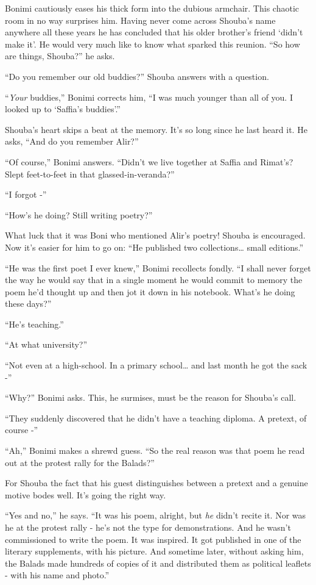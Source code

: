 \documentclass[twoside,11pt]{book}
\begin{document}
Bonimi cautiously eases his thick form into the dubious armchair. This chaotic room in no way surprises him. Having
never come across Shouba's name anywhere all these years he has concluded that his older brother's friend
`didn't make it'.
He would very much like to know what sparked this reunion. ``So how are things,
Shouba?'' he asks.

``Do you remember our old buddies?'' Shouba answers with a question.

``\textit{Your} buddies,'' Bonimi corrects him, ``I was  much younger than all of you. I looked up to
`Saffia's buddies'.''

Shouba's heart skips a beat at the memory. It's so long since he last heard it. He asks, ``And do you
remember Alir?''

``Of course,'' Bonimi answers. ``Didn't we live together at Saffia and Rimat's?
Slept feet-to-feet in  that glassed-in-veranda?''

``I forgot -''

``How's he doing? Still writing poetry?''

What luck that it was Boni who mentioned Alir's poetry! Shouba is encouraged. Now it's easier for him to go on:
``He published two collections{\ldots} small editions.''

``He was the first poet I ever knew,'' Bonimi recollects fondly. ``I shall never
forget the way he would say that in a single moment he would commit to memory the poem he'd thought up and then jot it
down in his notebook. What's he doing these days?''

``He's teaching.''

``At what university?''

``Not even at a high-school. In a primary
school{\dots} and last month he got the sack -''

``Why?'' Bonimi asks. This, he surmises, must be the reason for Shouba's call.

``They suddenly discovered that he didn't have a teaching diploma. A pretext, of course -''

``Ah,'' Bonimi makes a shrewd guess. ``So the real reason was that poem he read
out at the protest rally for the Balads?''

For Shouba the fact that his guest distinguishes between a pretext and a genuine motive bodes well. It's going the right
way.

``Yes and no,'' he says. ``It was his poem, alright, but \textit{he} didn't
recite it. Nor was he at the protest rally - he's not the type for demonstrations. And he wasn't commissioned to write
the poem. It was inspired. It got published in one of the literary supplements, with his picture. And sometime later,
without asking him, the Balads made hundreds of copies of it and distributed them as political leaflets - with his name
and photo.''
\end{document}
